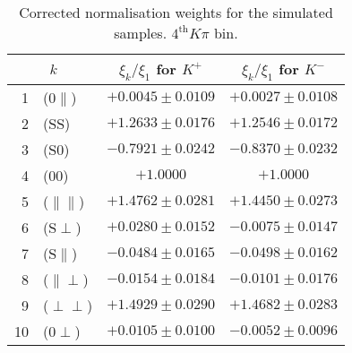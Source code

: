 \begin{table}[hbtp]
\center\footnotesize
  \caption{\small Corrected normalisation weights for the simulated samples. $4^{\text{th}}K\pi$ bin.}
  \center
  \begin{tabular}{r l c c}
    \multicolumn{2}{c}{$k$}       & $\xi_k/\xi_1$ for $K^+$    &  $\xi_k/\xi_1$ for $K^-$        \\
    \hline
     1  &  ($0\parallel$)         & $ +0.0045 \pm 0.0109 $ & $ +0.0027 \pm 0.0108 $     \\
     2  &  (SS)                   & $ +1.2633 \pm 0.0176 $ & $ +1.2546 \pm 0.0172 $     \\
     3  &  (S0)                   & $ -0.7921 \pm 0.0242 $ & $ -0.8370 \pm 0.0232 $     \\
     4  &  (00)                   & $ +1.0000            $ & $ +1.0000            $     \\
     5  &  ($\parallel\parallel$) & $ +1.4762 \pm 0.0281 $ & $ +1.4450 \pm 0.0273 $     \\
     6  &  (S$\perp$)             & $ +0.0280 \pm 0.0152 $ & $ -0.0075 \pm 0.0147 $     \\
     7  &  (S$\parallel$)         & $ -0.0484 \pm 0.0165 $ & $ -0.0498 \pm 0.0162 $     \\
     8  &  ($\parallel\perp$)     & $ -0.0154 \pm 0.0184 $ & $ -0.0101 \pm 0.0176 $     \\
     9  &  ($\perp\perp$)         & $ +1.4929 \pm 0.0290 $ & $ +1.4682 \pm 0.0283 $     \\
    10  &  ($0\perp$)             & $ +0.0105 \pm 0.0100 $ & $ -0.0052 \pm 0.0096 $     \\
    \hline                                                   
  \end{tabular}
\end{table}
\clearpage
